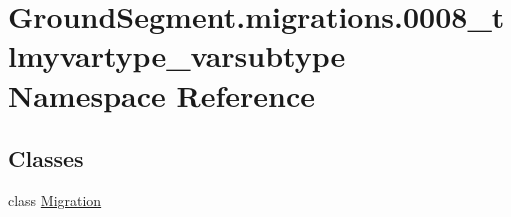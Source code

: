 \hypertarget{namespace_ground_segment_1_1migrations_1_10008__tlmyvartype__varsubtype}{}\section{Ground\+Segment.\+migrations.0008\+\_\+tlmyvartype\+\_\+varsubtype Namespace Reference}
\label{namespace_ground_segment_1_1migrations_1_10008__tlmyvartype__varsubtype}
\subsection*{Classes}
\begin{DoxyCompactItemize}
\item 
class \hyperlink{class_ground_segment_1_1migrations_1_10008__tlmyvartype__varsubtype_1_1_migration}{Migration}
\end{DoxyCompactItemize}
